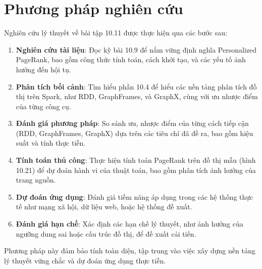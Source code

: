 \documentclass[conference]{IEEEtran}
\begin{document}
\section{Phương pháp nghiên cứu}
Nghiên cứu lý thuyết về bài tập 10.11 được thực hiện qua các bước sau:
\\
\begin{enumerate}
    \item \textbf{Nghiên cứu tài liệu}: Đọc kỹ bài 10.9 để nắm vững định nghĩa Personalized PageRank, bao gồm công thức tính toán, cách khởi tạo, và các yếu tố ảnh hưởng đến hội tụ.
    \\
    \item \textbf{Phân tích bối cảnh}: Tìm hiểu phần 10.4 để hiểu các nền tảng phân tích đồ thị trên Spark, như RDD, GraphFrames, và GraphX, cùng với ưu nhược điểm của từng công cụ.
    \\
    \item \textbf{Đánh giá phương pháp}: So sánh ưu, nhược điểm của từng cách tiếp cận (RDD, GraphFrames, GraphX) dựa trên các tiêu chí đã đề ra, bao gồm hiệu suất và tính thực tiễn.
    \\
    \item \textbf{Tính toán thủ công}: Thực hiện tính toán PageRank trên đồ thị mẫu (hình 10.21) để dự đoán hành vi của thuật toán, bao gồm phân tích ảnh hưởng của trang nguồn.
    \\
    \item \textbf{Dự đoán ứng dụng}: Đánh giá tiềm năng áp dụng trong các hệ thống thực tế như mạng xã hội, dữ liệu web, hoặc hệ thống đề xuất.
    \\
    \item \textbf{Đánh giá hạn chế}: Xác định các hạn chế lý thuyết, như ảnh hưởng của ngưỡng dung sai hoặc cấu trúc đồ thị, để đề xuất cải tiến.
\end{enumerate}
Phương pháp này đảm bảo tính toàn diện, tập trung vào việc xây dựng nền tảng lý thuyết vững chắc và dự đoán ứng dụng thực tiễn.
\end{document}
